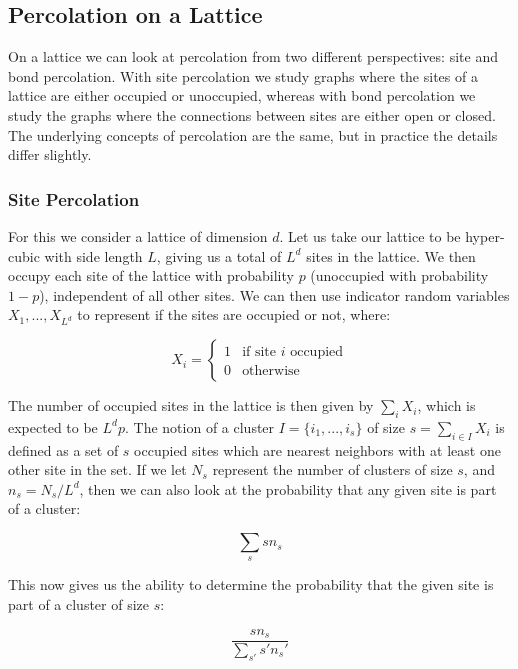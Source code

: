 \subsection{Percolation on a Lattice}
On a lattice we can look at percolation from two different perspectives: site and bond percolation.
With site percolation we study graphs where the sites of a lattice are either occupied or unoccupied, whereas with bond percolation we study the graphs where the connections between sites are either open or closed.
The underlying concepts of percolation are the same, but in practice the details differ slightly.



\subsubsection{Site Percolation}
For this we consider a lattice of dimension $d$.
Let us take our lattice to be hyper-cubic with side length $L$, giving us a total of $L^d$ sites in the lattice.
We then occupy each site of the lattice with probability $p$ (unoccupied with probability $1 - p$), independent of all other sites.
We can then use indicator random variables $X_1, ..., X_{L^d}$ to represent if the sites are occupied or not, where:

\[
X_i =
\begin{cases}
	1 & \text{if site } i \text{ occupied} \\
	0 & \text{otherwise}
\end{cases}
\]

The number of occupied sites in the lattice is then given by $\sum_i X_i$, which is expected to be $L^d p$.
The notion of a cluster $I = \{i_1, ..., i_s\}$ of size $s = \sum_{i \in I} X_i$ is defined as a set of $s$ occupied sites which are nearest neighbors with at least one other site in the set.
If we let $N_s$ represent the number of clusters of size $s$, and $n_s = N_s / L^d$, then we can also look at the probability that any given site is part of a cluster:

\begin{equation}
	\label{eqn:p_in_cluster}
	\sum_s s n_s
\end{equation}

This now gives us the ability to determine the probability that the given site is part of a cluster of size $s$:

\begin{equation}
	\label{eqn:p_in_cluster_size_s}
	\frac{s n_s}{\sum_{s'} s' n_s'}
\end{equation}


